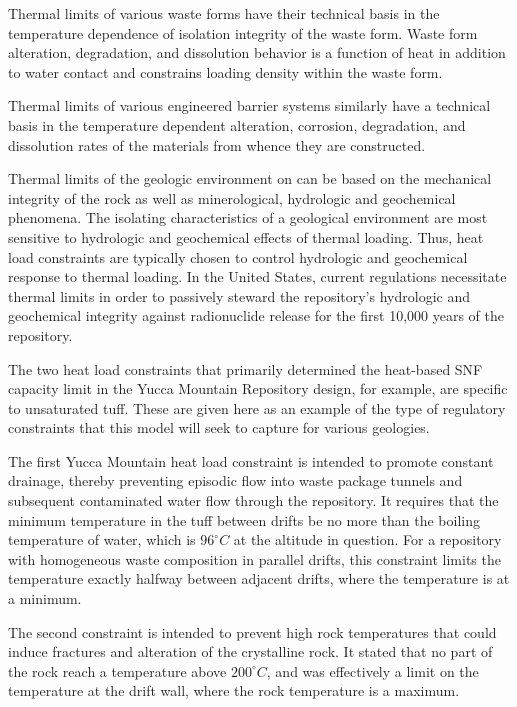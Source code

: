 Thermal limits of various waste forms have their technical basis in the 
temperature dependence of isolation integrity of the waste form. Waste form 
alteration, degradation, and dissolution behavior is a function of heat in 
addition to water contact and constrains loading density within the waste form. 
 
Thermal limits of various engineered barrier systems similarly have a technical 
basis in the temperature dependent alteration, corrosion, degradation, and 
dissolution rates of the materials from whence they are constructed.  

Thermal limits of the geologic environment on can be based on the mechanical 
integrity of the rock as well as minerological, hydrologic and geochemical 
phenomena. The isolating characteristics of a geological environment are most 
sensitive to hydrologic 
and geochemical effects of thermal loading. Thus, heat load constraints are 
typically chosen to control hydrologic and geochemical response to thermal 
loading. In the United States, current regulations necessitate thermal limits in 
order to passively steward the repository's hydrologic and geochemical integrity 
against radionuclide  release for the first 10,000 years of the repository.

The two heat load constraints that primarily determined the heat-based SNF 
capacity limit in the Yucca Mountain Repository design, for example, are 
specific to unsaturated tuff. These are given here as an example of the type of 
regulatory constraints that this model will seek to capture for various 
geologies. 

The first Yucca Mountain heat load constraint is intended to promote constant 
drainage, thereby preventing episodic flow into waste package tunnels and
subsequent contaminated water flow through the repository. It requires that the 
minimum temperature in the tuff between drifts be no  more than the boiling 
temperature of water, which is $96^{\circ}C$ at the altitude in question. For a 
repository with homogeneous waste composition in parallel drifts, this constraint 
limits the temperature exactly halfway between adjacent drifts, where the 
temperature is at a minimum.

The second constraint is intended to prevent high rock temperatures that could 
induce fractures and alteration of the crystalline rock. It stated that no part 
of the rock reach a temperature above $200^{\circ}C$, and was effectively a 
limit on the temperature at the drift wall, where the rock temperature is a 
maximum.  

